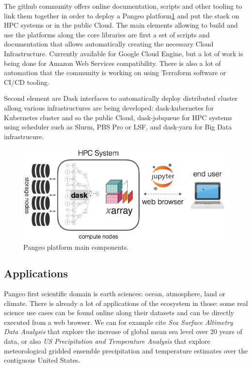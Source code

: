 \documentclass{article}
\begin{document}
The github community offers online documentation, scripts and other tooling to link them together in order to deploy a Pangeo platform\ref{pangeo_stack} and put the stack on HPC systems or in the public Cloud. The main elements allowing to build and use the platforms along the core libraries are first a set of scripts and documentation that allows automatically creating the necessary Cloud Infrastructure. Currently available for Google Cloud Engine, but a lot of work is being done for Amazon Web Services compatibility. There is also a lot of automation that the community is working on using Terraform software or CI/CD tooling.

Second element are Dask interfaces to automatically deploy distributed cluster allong various infrastructures are being developed: dask-kubernetes for Kubernetes cluster and so the public Cloud, dask-jobqueue\cite{b4} for HPC systems using scheduler such as Slurm, PBS Pro or LSF, and dask-yarn for Big Data infrastrucure.

\begin{figure}
  \centering
  \includegraphics[width=\columnwidth]{pangeo_stack.png}
  \caption{\label{pangeo_stack} Pangeo platform main components.}
\end{figure}

\subsection{Applications}
\label{ssec:applications}

Pangeo first scientific domain is earth sciences: ocean, atmosphere, land or climate. There is already a lot of applications of the ecosystem in those: some real science use cases can be found online\cite{b5} along their datasets and can be directly executed from a web browser. We can for example cite \textit{Sea Surface Altimetry Data Analysis} that explore the increase of global mean sea level over 20 years of data, or also \textit{US Precipitation and Temperature Analysis} that explore meteorological gridded ensemble precipitation and temperature estimates over the contiguous United States.
\end{document}

